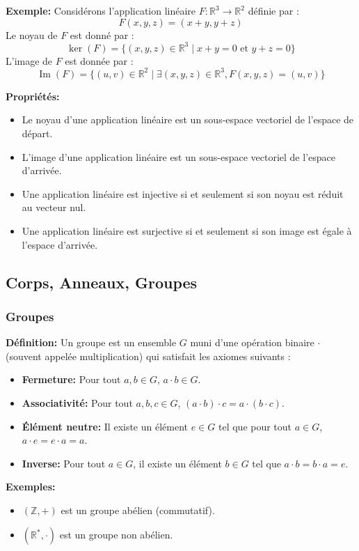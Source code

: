 \textbf{Exemple:}
Considérons l'application linéaire $F : \mathbb{R}^3 \to \mathbb{R}^2$ définie par :
\[
F(x, y, z) = (x + y, y + z)
\]
Le noyau de $F$ est donné par :
\[
\ker(F) = \{ (x, y, z) \in \mathbb{R}^3 \mid x + y = 0 \text{ et } y + z = 0 \}
\]
L'image de $F$ est donnée par :
\[
\operatorname{Im}(F) = \{ (u, v) \in \mathbb{R}^2 \mid \exists (x, y, z) \in \mathbb{R}^3, F(x, y, z) = (u, v) \}
\]

\textbf{Propriétés:}
\begin{itemize}
    \item Le noyau d'une application linéaire est un sous-espace vectoriel de l'espace de départ.
    \item L'image d'une application linéaire est un sous-espace vectoriel de l'espace d'arrivée.
    \item Une application linéaire est injective si et seulement si son noyau est réduit au vecteur nul.
    \item Une application linéaire est surjective si et seulement si son image est égale à l'espace d'arrivée.
\end{itemize}

\subsection{Corps, Anneaux, Groupes}

\subsubsection{Groupes}

\textbf{Définition:}
Un groupe est un ensemble $G$ muni d'une opération binaire $\cdot$ (souvent appelée multiplication) qui satisfait les axiomes suivants :
\begin{itemize}
    \item \textbf{Fermeture:} Pour tout $a, b \in G$, $a \cdot b \in G$.
    \item \textbf{Associativité:} Pour tout $a, b, c \in G$, $(a \cdot b) \cdot c = a \cdot (b \cdot c)$.
    \item \textbf{Élément neutre:} Il existe un élément $e \in G$ tel que pour tout $a \in G$, $a \cdot e = e \cdot a = a$.
    \item \textbf{Inverse:} Pour tout $a \in G$, il existe un élément $b \in G$ tel que $a \cdot b = b \cdot a = e$.
\end{itemize}

\textbf{Exemples:}
\begin{itemize}
    \item $(\mathbb{Z}, +)$ est un groupe abélien (commutatif).
    \item $(\mathbb{R}^*, \cdot)$ est un groupe non abélien.
\end{itemize}

